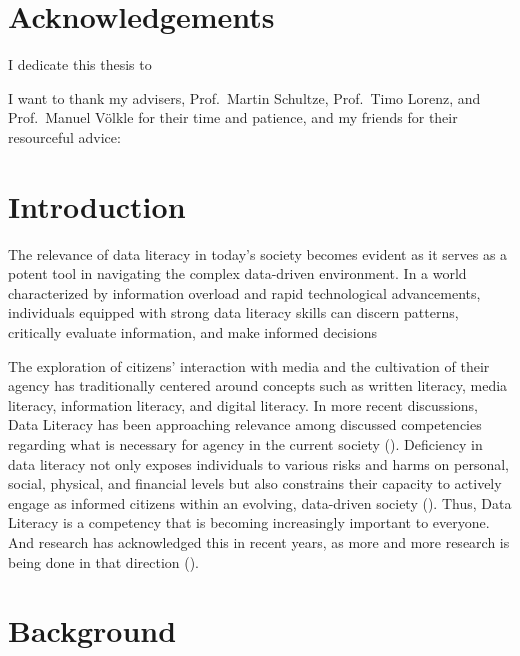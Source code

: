 \documentclass[
  12pt,
  a4paper,
  twoside]{article}
\begin{document}
\section*{Acknowledgements}\label{acknowledgements}

I dedicate this thesis to

I want to thank my advisers, Prof.~Martin Schultze, Prof.~Timo Lorenz, and Prof.~Manuel Völkle for their time and patience, and my friends for their resourceful advice:

\newpage\null\thispagestyle{empty}\newpage

\section{Introduction}\label{introduction}

The relevance of data literacy in today's society becomes evident as it serves as a potent tool in navigating the complex data-driven environment. In a world characterized by information overload and rapid technological advancements, individuals equipped with strong data literacy skills can discern patterns, critically evaluate information, and make informed decisions

The exploration of citizens' interaction with media and the cultivation of their agency has traditionally centered around concepts such as written literacy, media literacy, information literacy, and digital literacy. In more recent discussions, Data Literacy has been approaching relevance among discussed competencies regarding what is necessary for agency in the current society (). Deficiency in data literacy not only exposes individuals to various risks and harms on personal, social, physical, and financial levels but also constrains their capacity to actively engage as informed citizens within an evolving, data-driven society (). Thus, Data Literacy is a competency that is becoming increasingly important to everyone. And research has acknowledged this in recent years, as more and more research is being done in that direction ().

\section{Background}\label{background}
\end{document}
